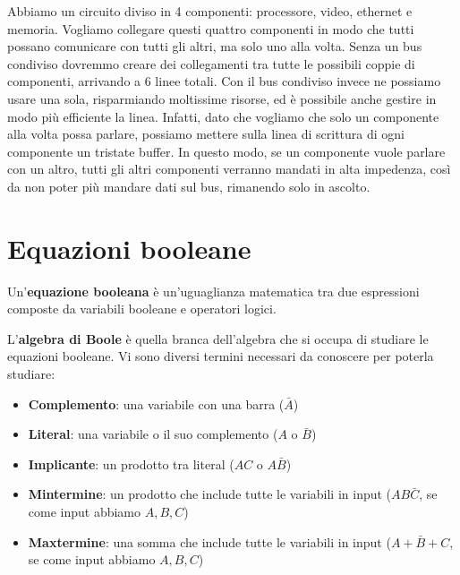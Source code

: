 \documentclass[11pt, a4paper, titlepage, oneside]{scrbook}
\begin{document}
Abbiamo un circuito diviso in 4 componenti: processore, video, ethernet e memoria. Vogliamo collegare questi quattro componenti in modo che tutti possano comunicare con tutti gli altri, ma solo uno alla volta. Senza un bus condiviso dovremmo creare dei collegamenti tra tutte le possibili coppie di componenti, arrivando a 6 linee totali. Con il bus condiviso invece ne possiamo usare una sola, risparmiando moltissime risorse, ed è possibile anche gestire in modo più efficiente la linea. Infatti, dato che vogliamo che solo un componente alla volta possa parlare, possiamo mettere sulla linea di scrittura di ogni componente un tristate buffer. In questo modo, se un componente vuole parlare con un altro, tutti gli altri componenti verranno mandati in alta impedenza, così da non poter più mandare dati sul bus, rimanendo solo in ascolto. 

\section{Equazioni booleane}

\begin{Definizione}
\label{def-equazioni-booleane}
Un'\textbf{equazione booleana} è un'uguaglianza matematica tra due espressioni composte da variabili booleane e operatori logici.
\end{Definizione}

\begin{Definizione}
\label{def-algebra-boole}
L'\textbf{algebra di Boole} è quella branca dell'algebra che si occupa di studiare le equazioni booleane. Vi sono diversi termini necessari da conoscere per poterla studiare:
\begin{itemize}
    \item \textbf{Complemento}: una variabile con una barra ($\bar{A}$)
    \item \textbf{Literal}: una variabile o il suo complemento ($A$ o $\bar{B}$)
    \item \textbf{Implicante}: un prodotto tra literal ($AC$ o $A \bar{B}$)
    \item \textbf{Mintermine}: un prodotto che include tutte le variabili in input ($AB\bar{C}$, se come input abbiamo $A,B,C$)
    \item \textbf{Maxtermine}: una somma che include tutte le variabili in input ($A + \bar{B} + C$, se come input abbiamo $A,B,C$)
\end{itemize}
\end{Definizione}
\end{document}
